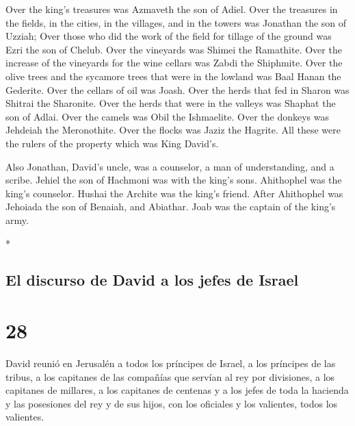 \begin{paracol}{2}
\begin{otherlanguage}{english}
 Over the king's treasures was Azmaveth the son of Adiel.
Over the treasures in the fields, in the cities, in the villages, and in
the towers was Jonathan the son of Uzziah;  Over those
who did the work of the field for tillage of the ground was Ezri the son
of Chelub.  Over the vineyards was Shimei the Ramathite.
Over the increase of the vineyards for the wine cellars was Zabdi the
Shiphmite.  Over the olive trees and the sycamore trees
that were in the lowland was Baal Hanan the Gederite. Over the cellars
of oil was Joash.  Over the herds that fed in Sharon was
Shitrai the Sharonite. Over the herds that were in the valleys was
Shaphat the son of Adlai.  Over the camels was Obil the
Ishmaelite. Over the donkeys was Jehdeiah the Meronothite. Over the
flocks was Jaziz the Hagrite.  All these were the rulers
of the property which was King David's.

 Also Jonathan, David's uncle, was a counselor, a man of
understanding, and a scribe. Jehiel the son of Hachmoni was with the
king's sons.  Ahithophel was the king's counselor. Hushai
the Archite was the king's friend.  After Ahithophel was
Jehoiada the son of Benaiah, and Abiathar. Joab was the captain of the
king's army.

\end{otherlanguage}

\switchcolumn[0]*

\hypertarget{el-discurso-de-david-a-los-jefes-de-israel}{%
\subsection{El discurso de David a los jefes de
Israel}\label{el-discurso-de-david-a-los-jefes-de-israel}}

\hypertarget{section-54}{%
\section{28}\label{section-54}}

 David reunió en Jerusalén a todos los príncipes de
Israel, a los príncipes de las tribus, a los capitanes de las compañías
que servían al rey por divisiones, a los capitanes de millares, a los
capitanes de centenas y a los jefes de toda la hacienda y las posesiones
del rey y de sus hijos, con los oficiales y los valientes, todos los
valientes.


\end{paracol}
